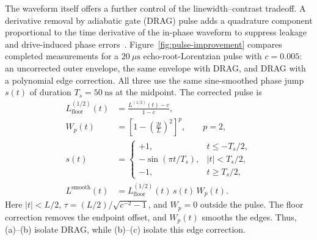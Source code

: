 The waveform itself offers a further control of the linewidth--contrast
tradeoff. A derivative removal by adiabatic gate (DRAG) pulse adds a
quadrature component proportional to the time derivative of the in-phase
waveform to suppress leakage and drive-induced phase
errors~\cite{motzoi_drag_2009,gambetta_analytic_2011}.
Figure~\ref{fig:pulse-improvement} compares completed measurements
for a $20~\mu\mathrm{s}$ echo-root-Lorentzian pulse with $c=0.005$: an uncorrected outer
envelope, the same envelope with DRAG, and DRAG with a polynomial edge
correction. All three use the same sine-smoothed phase jump $s(t)$ of
duration $T_s=50~\mathrm{ns}$ at the midpoint.
The corrected pulse is
\begin{align}
    L_{\mathrm{floor}}^{(1/2)}(t)
    &=\frac{L^{(1/2)}(t)-c}{1-c},\\
    W_p(t)&=\left[1-\left(\frac{2t}{L}\right)^2\right]^p,
    \qquad p=2,\\
    s(t)&=\begin{cases}
        +1, & t\leq-T_s/2,\\
        -\sin(\pi t/T_s), & |t|<T_s/2,\\
        -1, & t\geq T_s/2,
    \end{cases}\\
    L^{\mathrm{smooth}}(t)
    &=L_{\mathrm{floor}}^{(1/2)}(t)\,s(t)\,W_p(t).
\end{align}
Here $|t|<L/2$, $\tau=(L/2)/\sqrt{c^{-2}-1}$, and $W_p=0$ outside
the pulse. The floor correction removes the endpoint offset, and
$W_p(t)$ smooths the edges. Thus, (a)--(b) isolate DRAG,
while (b)--(c) isolate this edge correction.

